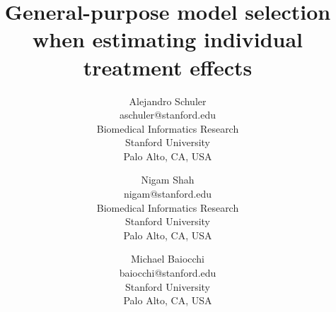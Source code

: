 \documentclass{article}
\begin{document}
\title{General-purpose model selection when estimating individual treatment effects}

\author{Alejandro Schuler \\
	aschuler@stanford.edu \\
       Biomedical Informatics Research\\
       Stanford University\\
       Palo Alto, CA, USA 
          \and
     Nigam Shah \\
     nigam@stanford.edu \\
       Biomedical Informatics Research\\
       Stanford University\\
       Palo Alto, CA, USA 
                 \and
     Michael Baiocchi \\
     baiocchi@stanford.edu \\
       Stanford University\\
       Palo Alto, CA, USA}

\maketitle



 

% 
% 
% 





\end{document}
